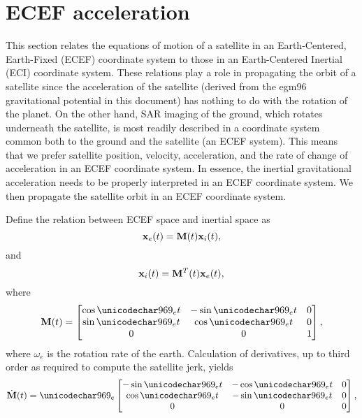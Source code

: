 \section{ECEF acceleration}
\label{an:inertialecef}
This section relates the equations of motion of a satellite in an Earth-Centered, Earth-Fixed (ECEF) coordinate system to those in an Earth-Centered Inertial (ECI) coordinate system. These relations play a role in propagating the orbit of a satellite since the acceleration of the satellite (derived from the egm96 gravitational potential in this document) has nothing to do with the rotation of the planet. On the other hand, SAR imaging of the ground, which rotates underneath the satellite, is most readily described in a coordinate system common both to the ground and the satellite (an ECEF system). This means that we prefer satellite position, velocity, acceleration, and the rate of change of acceleration in an ECEF coordinate system. In essence, the inertial gravitational acceleration needs to be properly interpreted in an ECEF coordinate system. We then propagate the satellite orbit in an ECEF coordinate system.
\par
Define the relation between ECEF space and inertial space as
\begin{equation}
 \vct{x}_e(t)=\mtx{M}(t)\vct{x}_i(t),
\end{equation}
and
\begin{equation}
 \vct{x}_i(t)=\mtx{M}^T(t)\vct{x}_e(t),
\end{equation}
where
\begin{equation}
 \mtx{M}(t)=\begin{bmatrix}
             \ct & -\st & 0\\
             \st & \ct  & 0\\
             0   & 0    & 1
            \end{bmatrix},
\end{equation}
where $\omega_e$ is the rotation rate of the earth.
Calculation of derivatives, up to third order as required to compute the satellite jerk, yields
\begin{equation}
 \dot{\mtx{M}}(t) = \omega_e\begin{bmatrix}
             -\st & -\ct & 0\\
             \ct & -\st  & 0\\
             0   & 0    & 0
            \end{bmatrix},
\end{equation}
